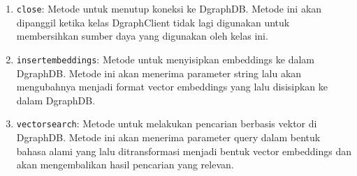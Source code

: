 \begin{enumerate}
	\item \texttt{close}: Metode untuk menutup koneksi ke DgraphDB. Metode ini akan dipanggil ketika kelas DgraphClient tidak lagi digunakan untuk membersihkan sumber daya yang digunakan oleh kelas ini.
	\item \texttt{insert\textunderscore embeddings}: Metode untuk menyisipkan embeddings ke dalam DgraphDB. Metode ini akan menerima parameter string lalu akan mengubahnya menjadi format vector embeddings yang lalu disisipkan ke dalam DgraphDB.
	\item \texttt{vector\textunderscore search}: Metode untuk melakukan pencarian berbasis vektor di DgraphDB. Metode ini akan menerima parameter query dalam bentuk bahasa alami yang lalu ditransformasi menjadi bentuk vector embeddings dan akan mengembalikan hasil pencarian yang relevan.
\end{enumerate}